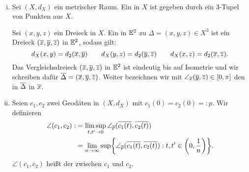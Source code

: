 \begin{definition}
\label{def:2.41}
	\mbox{} \\[-1.4cm]
	\begin{enumerate}[(i)]
		\item Sei $(X,d_X)$ ein metrischer Raum. 
		Ein  in $X$ ist gegeben durch ein $3$-Tupel von Punkten aus $X$.
		
		Sei $(x,y,z)$ ein Dreieck in $X$.
		Ein  in $\mathbb{E}^2$ zu $\Delta = (x,y,z) \in X^3$ ist ein Dreieck $(\overline{x},\overline{y},\overline{z})$ in $\mathbb{E}^2$, sodass gilt:
		\[
			d_X(x,y) = d_2(\overline{x},\overline{y}) \qquad d_X(y,z) = d_2(\overline{y},\overline{z}) \qquad d_X(x,z) = d_2(\overline{x},\overline{z}).
		\]
		Das Vergleichsdreieck $(\overline{x},\overline{y},\overline{z})$ in $\mathbb{E}^2$ ist eindeutig bis auf Isometrie und wir schreiben dafür $\overline{\Delta} = (\overline{x},\overline{y},\overline{z})$.
		Weiter bezeichnen wir mit $\angle_{\overline{x}}(\overline{y},\overline{z}) \in [0,\pi]$ den  in $\overline{\Delta}$ in $\overline{x}$.
		\item Seien $c_1,c_2$ zwei Geodäten in $(X,d_X)$ mit $c_1(0) = c_2(0) =:p$.
		Wir definieren
		\begin{align*}
			\angle(c_1,c_2) :&= \limsup_{t,t' \rightarrow 0} \angle_{\ol{p}} (\ol{c_1(t)},\ol{c_2(t)}) \\
			&= \lim\limits_{n \rightarrow \infty} \sup \penbrace*{ \angle_{\ol{p}}(\ol{c_1(t)},\ol{c_2(t)}) : t,t' \in \enbrace*{0,\frac{1}{n}}}.
		\end{align*}
		$\angle(c_1,c_2)$ heißt der  zwischen $c_1$ und $c_2$.
	\end{enumerate}
\end{definition}

